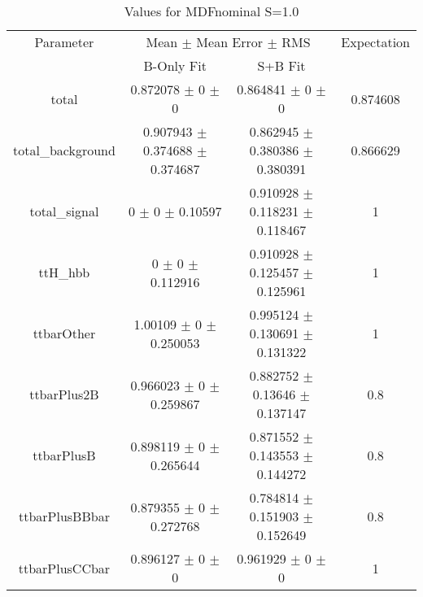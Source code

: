 \begin{table}
\centering
\caption{Values for MDFnominal S=1.0}
\begin{tabular}{cccc}
\toprule
Parameter & \multicolumn{2}{c}{Mean $\pm$ Mean Error $\pm$ RMS} & Expectation\\
 & B-Only Fit & S+B Fit & \\
\midrule
total & \num{0.872078} $\pm$ \num{0} $\pm$ \num{0} & \num{0.864841} $\pm$ \num{0} $\pm$ \num{0} & \num{0.874608}\\
total\_background & \num{0.907943} $\pm$ \num{0.374688} $\pm$ \num{0.374687} & \num{0.862945} $\pm$ \num{0.380386} $\pm$ \num{0.380391} & \num{0.866629}\\
total\_signal & \num{0} $\pm$ \num{0} $\pm$ \num{0.10597} & \num{0.910928} $\pm$ \num{0.118231} $\pm$ \num{0.118467} & \num{1}\\
ttH\_hbb & \num{0} $\pm$ \num{0} $\pm$ \num{0.112916} & \num{0.910928} $\pm$ \num{0.125457} $\pm$ \num{0.125961} & \num{1}\\
ttbarOther & \num{1.00109} $\pm$ \num{0} $\pm$ \num{0.250053} & \num{0.995124} $\pm$ \num{0.130691} $\pm$ \num{0.131322} & \num{1}\\
ttbarPlus2B & \num{0.966023} $\pm$ \num{0} $\pm$ \num{0.259867} & \num{0.882752} $\pm$ \num{0.13646} $\pm$ \num{0.137147} & \num{0.8}\\
ttbarPlusB & \num{0.898119} $\pm$ \num{0} $\pm$ \num{0.265644} & \num{0.871552} $\pm$ \num{0.143553} $\pm$ \num{0.144272} & \num{0.8}\\
ttbarPlusBBbar & \num{0.879355} $\pm$ \num{0} $\pm$ \num{0.272768} & \num{0.784814} $\pm$ \num{0.151903} $\pm$ \num{0.152649} & \num{0.8}\\
ttbarPlusCCbar & \num{0.896127} $\pm$ \num{0} $\pm$ \num{0} & \num{0.961929} $\pm$ \num{0} $\pm$ \num{0} & \num{1}\\
\bottomrule
\end{tabular}
\end{table}